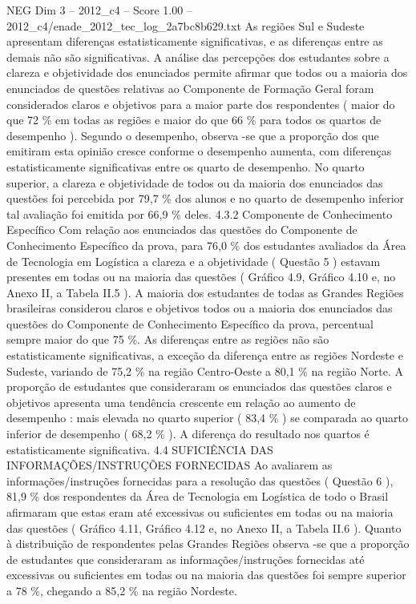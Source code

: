 \begin{textsample}{NEG Dim 3 – 2012\_c4 – Score 1.00 – 2012\_c4/enade\_2012\_tec\_log\_2a7bc8b629.txt}
As regiões Sul e Sudeste apresentam diferenças estatisticamente significativas, e as diferenças entre as demais não são significativas.
A análise das percepções dos estudantes sobre a clareza e objetividade dos enunciados permite afirmar que todos ou a maioria dos enunciados de questões relativas ao Componente de Formação Geral foram considerados claros e objetivos para a maior parte dos respondentes ( maior do que 72 \% em todas as regiões e maior do que 66 \% para todos os quartos de desempenho ).
Segundo o desempenho, observa -se que a proporção dos que emitiram esta opinião cresce conforme o desempenho aumenta, com diferenças estatisticamente significativas entre os quarto de desempenho.
No quarto superior, a clareza e objetividade de todos ou da maioria dos enunciados das questões foi percebida por 79,7 \% dos alunos e no quarto de desempenho inferior tal avaliação foi emitida por 66,9 \% deles. 4.3.2 Componente de Conhecimento Específico Com relação aos enunciados das questões do Componente de Conhecimento Específico da prova, para 76,0 \% dos estudantes avaliados da Área de Tecnologia em Logística a clareza e a objetividade ( Questão 5 ) estavam presentes em todas ou na maioria das questões ( Gráfico 4.9, Gráfico 4.10 e, no Anexo II, a Tabela II.5 ).
A maioria dos estudantes de todas as Grandes Regiões brasileiras considerou claros e objetivos todos ou a maioria dos enunciados das questões do Componente de Conhecimento Específico da prova, percentual sempre maior do que 75 \%.
As diferenças entre as regiões não são estatisticamente significativas, a exceção da diferença entre as regiões Nordeste e Sudeste, variando de 75,2 \% na região Centro-Oeste a 80,1 \% na região Norte.
A proporção de estudantes que consideraram os enunciados das questões claros e objetivos apresenta uma tendência crescente em relação ao aumento de desempenho : mais elevada no quarto superior ( 83,4 \% ) se comparada ao quarto inferior de desempenho ( 68,2 \% ).
A diferença do resultado nos quartos é estatisticamente significativa. 4.4 SUFICIÊNCIA DAS INFORMAÇÕES/INSTRUÇÕES FORNECIDAS Ao avaliarem as informações/instruções fornecidas para a resolução das questões ( Questão 6 ), 81,9 \% dos respondentes da Área de Tecnologia em Logística de todo o Brasil afirmaram que estas eram até excessivas ou suficientes em todas ou na maioria das questões ( Gráfico 4.11, Gráfico 4.12 e, no Anexo II, a Tabela II.6 ).
Quanto à distribuição de respondentes pelas Grandes Regiões observa -se que a proporção de estudantes que consideraram as informações/instruções fornecidas até excessivas ou suficientes em todas ou na maioria das questões foi sempre superior a 78 \%, chegando a 85,2 \% na região Nordeste.

\end{textsample}
